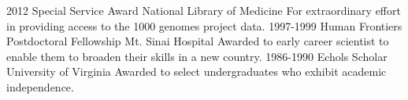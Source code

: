 \documentclass[]{dmc-cv} %
\begin{document}
\begin{entrylist}
\entry
{2012}
{Special Service Award}
{National Library of Medicine}
{For extraordinary effort in providing access to the 1000 genomes project data.}
\entry
{1997-1999}
{Human Frontiers Postdoctoral Fellowship}
{Mt. Sinai Hospital}
{Awarded to early career scientist to enable them to broaden their skills in a new country.}
\entry
{1986-1990}
{Echols Scholar}
{University of Virginia}
{Awarded to select undergraduates who exhibit academic independence.}
\end{entrylist}

\end{document}
